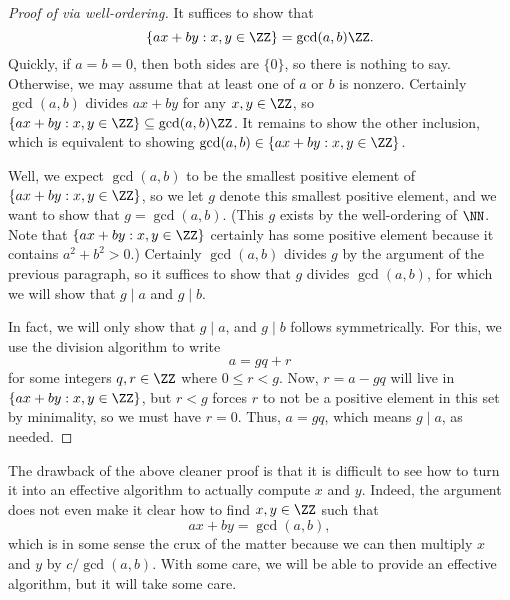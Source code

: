 \documentclass[../notes.tex]{subfiles}
\begin{document}
\begin{proof}[Proof of  via well-ordering]
	It suffices to show that
	\[\{ax+by:x,y\in\ZZ\}=\gcd(a,b)\ZZ.\]
	Quickly, if $a=b=0$, then both sides are $\{0\}$, so there is nothing to say. Otherwise, we may assume that at least one of $a$ or $b$ is nonzero. Certainly $\gcd(a,b)$ divides $ax+by$ for any $x,y\in\ZZ$, so $\{ax+by:x,y\in\ZZ\}\subseteq\gcd(a,b)\ZZ$. It remains to show the other inclusion, which is equivalent to showing $\gcd(a,b)\in\{ax+by:x,y\in\ZZ\}$.

	Well, we expect $\gcd(a,b)$ to be the smallest positive element of $\{ax+by:x,y\in\ZZ\}$, so we let $g$ denote this smallest positive element, and we want to show that $g=\gcd(a,b)$. (This $g$ exists by the well-ordering of $\NN$. Note that $\{ax+by:x,y\in\ZZ\}$ certainly has some positive element because it contains $a^2+b^2>0$.) Certainly $\gcd(a,b)$ divides $g$ by the argument of the previous paragraph, so it suffices to show that $g$ divides $\gcd(a,b)$, for which we will show that $g\mid a$ and $g\mid b$.

	In fact, we will only show that $g\mid a$, and $g\mid b$ follows symmetrically. For this, we use the division algorithm to write
	\[a=gq+r\]
	for some integers $q,r\in\ZZ$ where $0\le r<g$. Now, $r=a-gq$ will live in $\{ax+by:x,y\in\ZZ\}$, but $r<g$ forces $r$ to not be a positive element in this set by minimality, so we must have $r=0$. Thus, $a=gq$, which means $g\mid a$, as needed.
\end{proof}
The drawback of the above cleaner proof is that it is difficult to see how to turn it into an effective algorithm to actually compute $x$ and $y$. Indeed, the argument does not even make it clear how to find $x,y\in\ZZ$ such that
\[ax+by=\gcd(a,b),\]
which is in some sense the crux of the matter because we can then multiply $x$ and $y$ by $c/\gcd(a,b)$. With some care, we will be able to provide an effective algorithm, but it will take some care.
\end{document}

